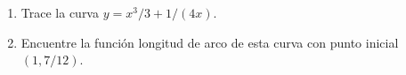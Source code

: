 \item 
    \begin{enumerate}
        \item[(a)] Trace la curva $y = x^3/3 + 1/(4x)$.
        \item[(b)] Encuentre la función longitud de arco de esta curva con punto inicial $(1, 7/12)$.
    \end{enumerate}
